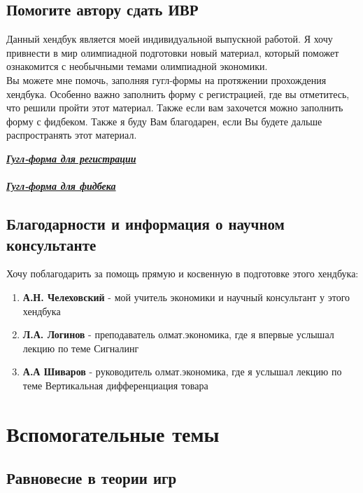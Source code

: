 \section{Помогите автору сдать ИВР}
\indent\setlength{\parindent}{1em}Данный хендбук является моей индивидуальной выпускной работой. Я хочу привнести в мир олимпиадной подготовки новый материал, который поможет ознакомится с необычными темами олимпиадной экономики.\smallskip\\
\indent\setlength{\parindent}{1em}Вы можете мне помочь, заполняя гугл-формы на протяжении прохождения хендбука. Особенно важно заполнить форму с регистрацией, где вы отметитесь, что решили пройти этот материал. Также если вам захочется можно заполнить форму с фидбеком. Также я буду Вам благодарен, если Вы будете дальше распространять этот материал.\smallskip\\
\begin{center}
    \textbf{\textit{\href{https://forms.gle/bW7CD2zcdUhnbFnR7}{Гугл-форма для регистрации}}}\\\smallskip\\
    \textbf{\textit{\href{https://forms.gle/31gene8PMRuqCLvr9}{Гугл-форма для фидбека}}}
\end{center}

\section{Благодарности и информация о научном консультанте}
\indent\setlength{\parindent}{1em}Хочу поблагодарить за помощь прямую и косвенную в подготовке этого хендбука:
\begin{enumerate}
    \item \textbf{А.Н. Челеховский} - мой учитель экономики и научный консультант у этого хендбука
    \item \textbf{Л.А. Логинов} - преподаватель олмат.экономика, где я впервые услышал лекцию по теме Сигналинг
    \item \textbf{А.А Шиваров} - руководитель олмат.экономика, где я услышал лекцию по теме Вертикальная дифференциация товара
\end{enumerate}



\chapter{Вспомогательные темы}


\section{Равновесие в теории игр}

